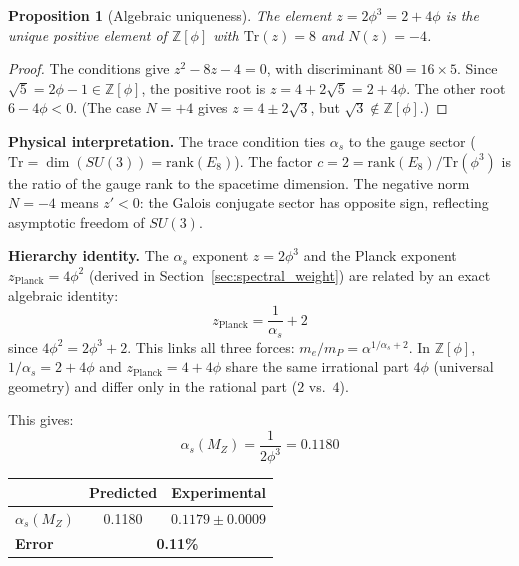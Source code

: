 \documentclass[12pt,a4paper]{article}
\newtheorem{proposition}{Proposition}
\theoremstyle{definition}
\begin{document}
\begin{proposition}[Algebraic uniqueness]
The element $z = 2\phi^3 = 2 + 4\phi$ is the unique positive element of $\mathbb{Z}[\phi]$ with $\mathrm{Tr}(z) = 8$ and $N(z) = -4$.
\end{proposition}

\begin{proof}
The conditions give $z^2 - 8z - 4 = 0$, with discriminant $80 = 16 \times 5$.  Since $\sqrt{5} = 2\phi-1 \in \mathbb{Z}[\phi]$, the positive root is $z = 4 + 2\sqrt{5} = 2 + 4\phi$.  The other root $6 - 4\phi < 0$.  (The case $N = +4$ gives $z = 4 \pm 2\sqrt{3}$, but $\sqrt{3} \notin \mathbb{Z}[\phi]$.)
\end{proof}

\textbf{Physical interpretation.} The trace condition ties $\alpha_s$ to the gauge sector ($\text{Tr} = \dim(SU(3)) = \text{rank}(E_8)$).  The factor $c = 2 = \text{rank}(E_8)/\text{Tr}(\phi^3)$ is the ratio of the gauge rank to the spacetime dimension.  The negative norm $N = -4$ means $z' < 0$: the Galois conjugate sector has opposite sign, reflecting asymptotic freedom of $SU(3)$.

\textbf{Hierarchy identity.}  The $\alpha_s$ exponent $z = 2\phi^3$ and the Planck exponent $z_{\text{Planck}} = 4\phi^2$ (derived in Section~\ref{sec:spectral_weight}) are related by an exact algebraic identity:
\begin{equation}
\boxed{z_{\text{Planck}} = \frac{1}{\alpha_s} + 2}
\label{eq:hierarchy_identity}
\end{equation}
since $4\phi^2 = 2\phi^3 + 2$.  This links all three forces: $m_e/m_P = \alpha^{1/\alpha_s + 2}$.  In $\mathbb{Z}[\phi]$, $1/\alpha_s = 2 + 4\phi$ and $z_{\text{Planck}} = 4 + 4\phi$ share the same irrational part $4\phi$ (universal geometry) and differ only in the rational part ($2$ vs.\ $4$).

This gives:
\begin{equation}
\boxed{\alpha_s(M_Z) = \frac{1}{2\phi^3} = 0.1180}
\label{eq:alpha_s}
\end{equation}
\begin{center}
\begin{tabular}{lcc}
\toprule
& \textbf{Predicted} & \textbf{Experimental} \\
\midrule
$\alpha_s(M_Z)$ & 0.1180 & $0.1179 \pm 0.0009$ \\
\textbf{Error} & \multicolumn{2}{c}{\textbf{0.11\%}} \\
\bottomrule
\end{tabular}
\end{center}
\end{document}
